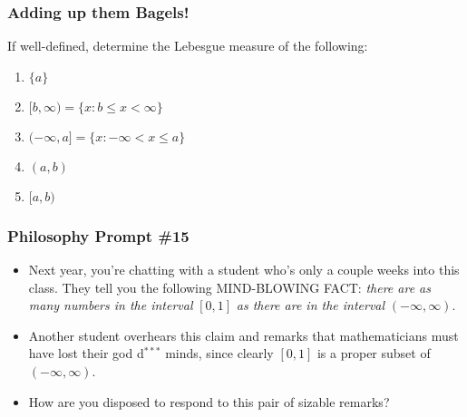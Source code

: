 \begin{frame}
\frametitle{Adding up them Bagels!}

If well-defined, determine the Lebesgue measure of the following:

\begin{enumerate}[<+->]

\item $\{a \}$

\item $[b, \infty) = \{ x : b \leq x < \infty \}$

\item $(-\infty, a] = \{ x : -\infty < x \leq a \}$

\item $(a, b)$

\item $[a, b) $

\end{enumerate}
\end{frame}

\begin{frame}
\frametitle{Philosophy Prompt \#15}

\begin{itemize}[<+->]


\item Next year, you're chatting with a student who's only a couple weeks into this class. They tell you the following MIND-BLOWING FACT: \textit{there are as many numbers in the interval} $[0, 1]$ \textit{as there are in the interval} $(-\infty, \infty)$. 

\item Another student overhears this claim and remarks that mathematicians must have lost their god d$^{***}$ minds, since clearly $[0, 1]$ is a proper subset of  $(-\infty, \infty)$.

\item How are you disposed to respond to this pair of sizable remarks? 






\end{itemize}
\end{frame}

